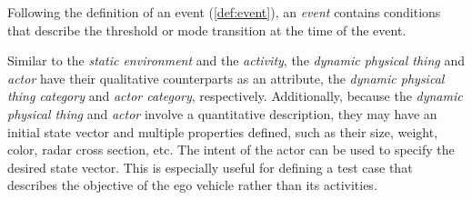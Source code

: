 
Following the definition of an event (\cref{def:event}), an \textit{event} contains conditions that describe the threshold or mode transition at the time of the event.

Similar to the \textit{static environment} and the \textit{activity}, the \cstartb\textit{dynamic physical thing} and \textit{actor} have their qualitative counterparts as an attribute, the \textit{dynamic physical thing category} and \textit{actor category}, respectively. Additionally, because the \textit{dynamic physical thing} and \textit{actor} involve a quantitative description, they may have an initial state vector and multiple properties defined, such as their \cendb size, weight, color, radar cross section, etc. \cstartb The intent of the actor can be used to specify the desired state vector. \cendb This is especially useful for defining a test case that describes the objective of the ego vehicle rather than its activities. 


